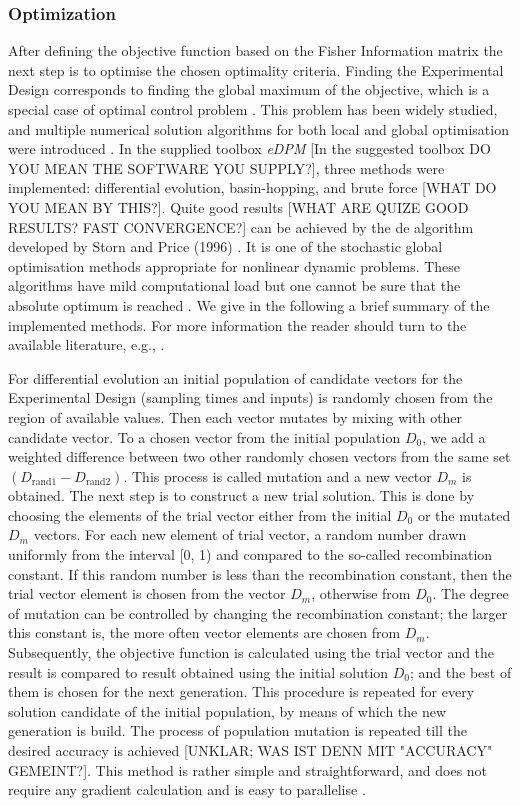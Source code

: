 \documentclass[10pt,A4paper]{article}
\begin{document}
\subsubsection*{Optimization}
After defining the objective function based on the Fisher Information matrix the next step is to optimise the chosen optimality criteria. 
Finding the Experimental Design corresponds to finding the global maximum of the objective, which is a special case of optimal control problem \cite{}. 
This problem has been widely studied, and multiple numerical solution algorithms for both local and global optimisation were introduced \cite{}. 
In the supplied toolbox {\it eDPM}  [In the suggested toolbox DO YOU MEAN THE SOFTWARE YOU SUPPLY?], three methods were implemented: differential evolution, basin-hopping, and brute force [WHAT DO YOU MEAN BY THIS?]. 
Quite good results [WHAT ARE QUIZE GOOD RESULTS? FAST CONVERGENCE?] can be achieved by the \ac{de} algorithm developed by Storn and Price (1996) \cite{stornDifferentialEvolutionSimple1997}. 
It is one of the stochastic global optimisation methods appropriate for nonlinear dynamic problems. 
These algorithms have mild computational load but one cannot be sure that the absolute optimum is reached \cite{}. 
We give in the following a brief summary of the implemented methods. 
For more information the reader should turn to the available literature, e.g., \cite{}. 
\newline

For differential evolution an initial population of candidate vectors for the Experimental Design (sampling times and inputs) is randomly chosen from the region of available values. 
Then each vector mutates by mixing with other candidate vector. 
To a chosen vector from the initial population $D_0$, we add a weighted difference between two other randomly chosen vectors from the same set $(D_\text{rand1} - D_\text{rand2})$. 
This process is called mutation and a new vector $D_m$ is obtained. The next step is to construct a new trial solution.
This is done by choosing the elements of the trial vector either from the initial $D_0$ or the mutated $D_m$ vectors. 
For each new element of trial vector, a random number drawn uniformly from the interval [0, 1) and compared to the so-called recombination constant. 
If this random number is less than the recombination constant, then the trial vector element is chosen from the vector $D_m$, otherwise from $D_0$. 
The degree of mutation can be controlled by changing the recombination constant; the larger this constant is, the more often vector elements are chosen from $D_m$. 
Subsequently, the objective function is calculated using the trial vector and the result is compared to result obtained using the initial solution $D_0$; and the best of them is chosen for the next generation. 
This procedure is repeated for every solution candidate of the initial population, by means of which the new generation is build. 
The process of population mutation is repeated till the desired accuracy is achieved [UNKLAR; WAS IST DENN MIT "ACCURACY" GEMEINT?]. 
This method is rather simple and straightforward, and does not require any gradient calculation and is easy to parallelise \cite{}.
\newline
\end{document}
